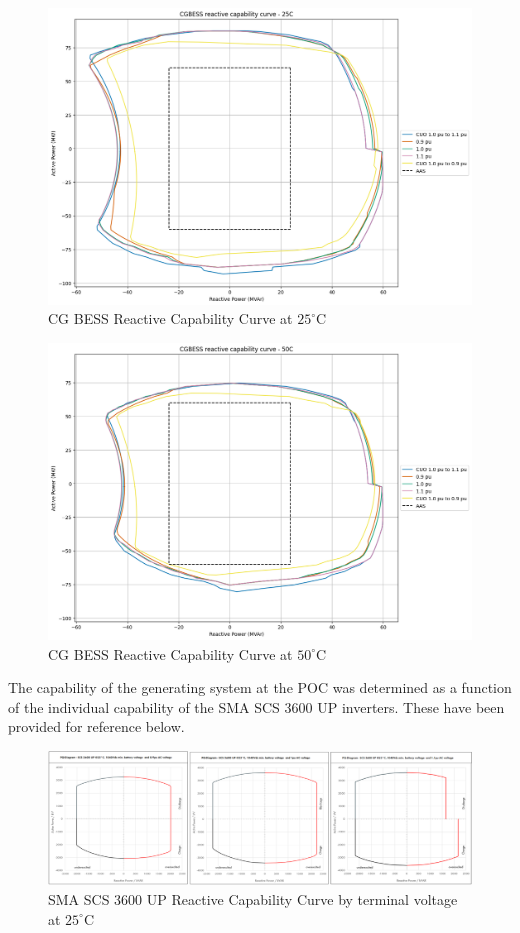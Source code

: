 \documentclass{../grid-link-report}
\begin{document}
	\begin{figure}[H]
		\centering
		\includegraphics[width=0.9\linewidth]{report-assets/reactive capability curve - 25C.png}
		\caption{CG BESS Reactive Capability Curve at $25^\circ$C}
		\label{fig:q-capability-25degc}
	\end{figure}

	\begin{figure}[H]
		\centering
		\includegraphics[width=0.9\linewidth]{report-assets/reactive capability curve - 50C.png}
		\caption{CG BESS Reactive Capability Curve at $50^\circ$C}
		\label{fig:q-capability-50degc}
	\end{figure}
	
	The capability of the generating system at the POC was determined as a function of the individual capability of the SMA SCS 3600 UP inverters. These have been provided for reference below.
	
	\begin{figure}[H]
		\centering
		\includegraphics[width=1.0\linewidth]{report-assets/inv-q-cap-25degC.png}
		\caption{SMA SCS 3600 UP Reactive Capability Curve by terminal voltage at $25^{\circ}\text{C}$}
		\label{fig:inv-q-capability-25degc}
	\end{figure}	
\end{document}
